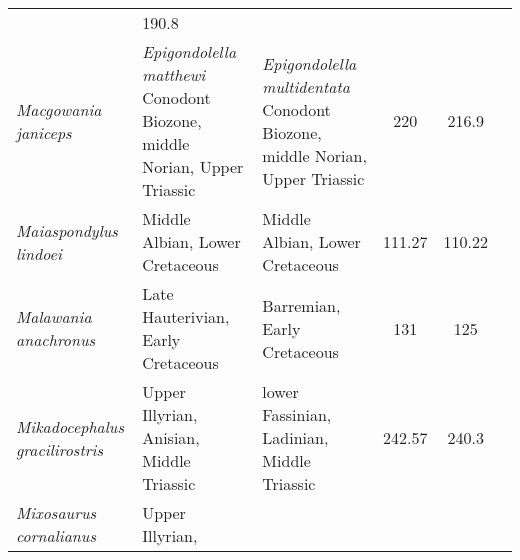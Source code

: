 \begin{longtabu}{>{\itshape}lXXSSl}
                                                             & 190.8
                                                             &
                                                             \cite{McGowan1989P,McGowan2003HoP} \\        
	Macgowania janiceps                                  &
        \emph{Epigondolella matthewi} Conodont Biozone, middle Norian, Upper
        Triassic                                                      &
        \emph{Epigondolella multidentata} Conodont Biozone, middle Norian, Upper
        Triassic                                                  & 220
                                                                  & 216.9
                                                                  &
                                                                  \cite{McGowan1996CJES} \\                    
	Maiaspondylus lindoei                                & Middle Albian,
        Lower Cretaceous
                                                             & Middle Albian,
        Lower Cretaceous
                                                             & 111.27
                                                             & 110.22
                                                             &
                                                             \cite{Maxwell2006P} \\                   
	Malawania anachronus                                 & Late Hauterivian,
        Early Cretaceous
                                                             & Barremian, Early
        Cretaceous
                                                             & 131
                                                             & 125
                                                             &
                                                             \cite{Fischer2013BL} \\                   
	Mikadocephalus gracilirostris                        & Upper Illyrian,
        Anisian, Middle Triassic
                                                             & lower Fassinian,
        Ladinian, Middle Triassic
                                                             & 242.57
                                                             & 240.3
                                                             &
                                                             \cite{Maisch1997PZ} \\                    
	Mixosaurus cornalianus                               & Upper Illyrian,

\end{longtabu}
